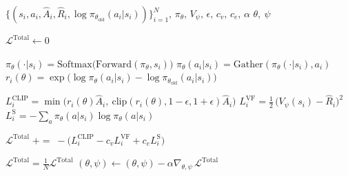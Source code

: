 \documentclass{article}
\newcommand{\coloneqq}{\mathrel{\mathop:}=}
\begin{document}
\begin{algorithm}
\caption*{\textbf{Algorithm:} Gradient Propagation (Mini-Batch)}
\begin{algorithmic}[1]
    \Require $\{(s_i, a_i, \hat{A}_i, \hat{R}_i, \log \pi_{\theta_{\text{old}}}(a_i|s_i))\}_{i=1}^N,\, \pi_{\theta},\, V_{\psi},\, \epsilon,\, c_v,\, c_e,\, \alpha$
    \Ensure $\theta,\ \psi$

    \State $\mathcal{L}^{\text{Total}} \gets 0$ 

        \State $\pi_\theta(\cdot|s_i) = \text{Softmax}\big(\text{Forward}(\pi_{\theta}, s_i)\big)$ 
        \State $\pi_{\theta}(a_i|s_i) = \text{Gather}(\pi_\theta(\cdot|s_i), a_i)$
        \State $r_i(\theta) = \exp\!\big(\log \pi_{\theta}(a_i|s_i) - \log \pi_{\theta_{\text{old}}}(a_i|s_i)\big)$

        \State $L^{\text{CLIP}}_i = \min\!\big( r_i(\theta)\hat{A}_i,\ \text{clip}(r_i(\theta),1-\epsilon,1+\epsilon)\hat{A}_i \big)$ 
        \State $L^{\text{VF}}_i = \tfrac{1}{2}\,\big(V_{\psi}(s_i) - \hat{R}_i\big)^2$ 
        \State $L^{\text{S}}_i = - \sum_{a} \pi_{\theta}(a|s_i)\log \pi_{\theta}(a|s_i)$ 

        \State $\mathcal{L}^{\text{Total}} \;{+}{=}\; -\big(L^{\text{CLIP}}_i - c_v L^{\text{VF}}_i + c_e L^{\text{S}}_i\big)$ 
    \EndFor
    
    \State $\mathcal{L}^{\text{Total}} = \tfrac{1}{N}\mathcal{L}^{\text{Total}}$ 
    \State $(\theta,\psi) \gets (\theta,\psi) - \alpha\nabla_{\theta,\psi}\,\mathcal{L}^{\text{Total}}$
    
\end{algorithmic}
\end{algorithm}
\end{document}

